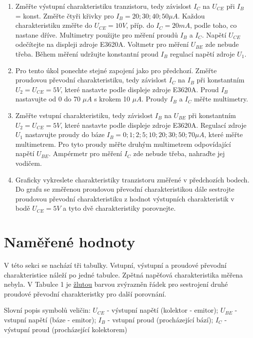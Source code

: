 \documentclass[a4paper, czech]{article}
\begin{document}
\begin{enumerate}
    \item Změřte výstupní charakteristiku tranzistoru, tedy závislost $I_C$ na $U_{CE}$ při $I_B$ = konst. Změřte čtyři křivky pro $I_B = 20; 30; 40; 50 \mu A$. Každou charakteristiku změřte do $U_{CE} = 10 V$, příp. do $I_C = 20 mA$, podle toho, co nastane dříve. Multimetry použijte pro měření proudů $I_B$ a $I_C$. Napětí $U_{CE}$ odečítejte na displeji zdroje E3620A. Voltmetr pro měření $U_{BE}$ zde nebude třeba. Během měření udržujte konstantní proud $I_B$ regulací napětí zdroje $U_1$.
    \item Pro tento úkol ponechte stejné zapojení jako pro předchozí. Změřte proudovou převodní charakteristiku, tedy závislost $I_C$ na $I_B$ při konstantním $U_2 = U_{CE} = 5 V$, které nastavte podle displeje zdroje E3620A. Proud $I_B$ nastavujte od 0 do 70 $\mu A$ s krokem 10 $\mu A$. Proudy $I_B$ a $I_C$ měřte multimetry.
    \item Změřte vstupní charakteristiku, tedy závislost $I_B$ na $U_{BE}$ při konstantním $U_2 = U_{CE} = 5 V$, které nastavte podle displeje zdroje E3620A. Regulací zdroje $U_1$ nastavujte proudy do báze $I_B = 0;1; 2; 5; 10; 20; 30; 50; 70 \mu A$, které měřte multimetrem. Pro tyto proudy měřte druhým multimetrem odpovídající napětí $U_{BE}$. Ampérmetr pro měření $I_C$ zde nebude třeba, nahraďte jej vodičem.
    \item Graficky vykreslete charakteristiky tranzistoru změřené v předchozích bodech. Do grafu se změřenou proudovou převodní charakteristikou dále sestrojte proudovou převodní charakteristiku z hodnot výstupních charakteristik v bodě $U_{CE} = 5 V$ a tyto dvě charakteristiky porovnejte.
\end{enumerate}

\section{Naměřené hodnoty}

V této sekci se nachází tři tabulky.
Vstupní, výstupní a proudové převodní charakteristice náleží po jedné tabulce.
Zpětná napěťová charakteristika měřena nebyla.
V Tabulce 1 je \underline{žlutou} barvou zvýrazněn řádek pro sestrojení druhé proudové převodní charakteristky pro další porovnání. 

Slovní popis symbolů veličin:
$U_{CE}$ - výstupní napětí (kolektor - emitor);
$U_{BE}$ - vstupní napětí (báze - emitor);
$I_B$ - vstupní proud (procházející bází);
$I_C$ - výstupní proud (procházející kolektorem)
\end{document}
